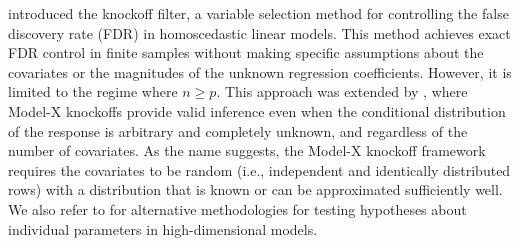 \documentclass[11pt]{article}
\begin{document}
\cite{Barber_2015} introduced the knockoff filter, a variable selection method for controlling the false discovery rate (FDR) in homoscedastic linear models. This method achieves exact FDR control in finite samples without making specific assumptions about the covariates or the magnitudes of the unknown regression coefficients. However, it is limited to the regime where $n\ge p$. This approach was extended by \citep{candes2017panning}, where Model-X knockoffs provide valid inference even when the conditional distribution of the response is arbitrary and completely unknown, and regardless of the number of covariates. As the name suggests, the Model-X knockoff framework requires the covariates to be random (i.e., independent and identically distributed rows) with a distribution that is known or can be approximated sufficiently well. We also refer to \cite{javanmard2014hypothesis} for alternative methodologies for testing hypotheses about individual parameters in high-dimensional models.
\end{document}
